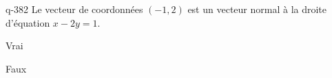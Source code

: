 \begin{truefalse}{q-382}
Le vecteur de coordonnées $(-1,2)$ est un vecteur normal à la droite d'équation $x-2y=1$.
\item* Vrai
\item Faux
\end{truefalse}

